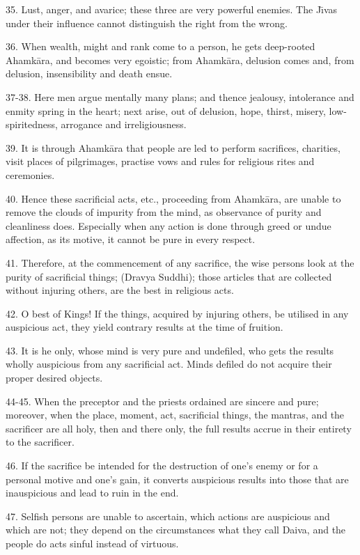 35. Lust, anger, and avarice; these three are very powerful enemies. The J\={\i}vas under their influence cannot distinguish the right from the wrong.

36. When wealth, might and rank come to a person, he gets deep-rooted Ahamk\=ara, and becomes very egoistic; from Ahamk\=ara, delusion comes and, from delusion, insensibility and death ensue.

37-38. Here men argue mentally many plans; and thence jealousy, intolerance and enmity spring in the heart; next arise, out of delusion, hope, thirst, misery, low-spiritedness, arrogance and irreligiousness.

39. It is through Ahamk\=ara that people are led to perform sacrifices, charities, visit places of pilgrimages, practise vows and rules for religious rites and ceremonies.

40. Hence these sacrificial acts, etc., proceeding from Ahamk\=ara, are unable to remove the clouds of impurity from the mind, as observance of purity and cleanliness does. Especially when any action is done through greed or undue affection, as its motive, it cannot be pure in every respect.

41. Therefore, at the commencement of any sacrifice, the wise persons look at the purity of sacrificial things; (Dravya Suddhi); those articles that are collected without injuring others, are the best in religious acts.

42. O best of Kings! If the things, acquired by injuring others, be utilised in any auspicious act, they yield contrary results at the time of fruition.

43. It is he only, whose mind is very pure and undefiled, who gets the results wholly auspicious from any sacrificial act. Minds defiled do not acquire their proper desired objects.

44-45. When the preceptor and the priests ordained are sincere and pure; moreover, when the place, moment, act, sacrificial things, the mantras, and the sacrificer are all holy, then and there only, the full results accrue in their entirety to the sacrificer.

46. If the sacrifice be intended for the destruction of one's enemy or for a personal motive and one's gain, it converts auspicious results into those that are inauspicious and lead to ruin in the end.

47. Selfish persons are unable to ascertain, which actions are auspicious and which are not; they depend on the circumstances what they call Daiva, and the people do acts sinful instead of virtuous.

